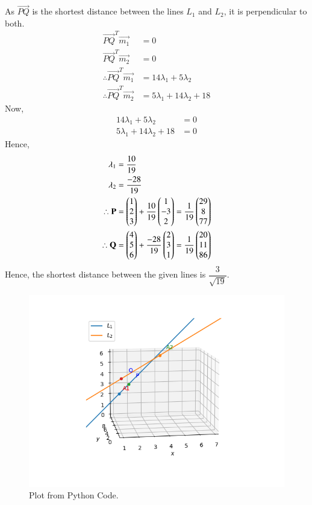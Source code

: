 \documentclass[journal,12pt,twocolumn]{IEEEtran}
\begin{document}
As $\vec{PQ}$ is the shortest distance between the lines $L_1$ and $L_2$, it is perpendicular to both.
\begin{align}
    \vec{PQ}^T\vec{m_1} &= 0\\
    \vec{PQ}^T\vec{m_2} &= 0\\
    \therefore \vec{PQ}^T\vec{m_1} &= 14\lambda_1 + 5\lambda_2\\
    \therefore \vec{PQ}^T\vec{m_2} &= 5\lambda_1 + 14\lambda_2 + 18
\end{align}
Now,
\begin{align}
    14\lambda_1 + 5\lambda_2 &= 0\\
    5\lambda_1 + 14\lambda_2 + 18 &= 0
\end{align}
Hence,
\begin{align}
    \lambda_1 &= \frac{10}{19}\\ \lambda_2 &= \frac{-28}{19}\\
    \therefore \mathbf{P} &= \begin{pmatrix}1\\2\\3\end{pmatrix} + \frac{10}{19} \begin{pmatrix}1\\-3\\2\end{pmatrix} = \frac{1}{19}\begin{pmatrix}29\\8\\77\end{pmatrix}\\
    \therefore \mathbf{Q} &= \begin{pmatrix}4\\5\\6\end{pmatrix} + \frac{-28}{19} \begin{pmatrix}2\\3\\1\end{pmatrix} = \frac{1}{19}\begin{pmatrix}20\\11\\86\end{pmatrix}
\end{align}
Hence, the shortest distance between the given lines is $\dfrac{3}{\sqrt{19}}$.
\begin{figure}[h]
    \centering
    \includegraphics[scale = 0.6]{figure/Figure_1.png}
    \caption{Plot from Python Code.}
    \label{fig:my_label}
\end{figure}
\end{document}
